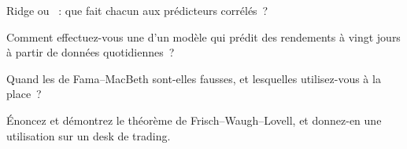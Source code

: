 \begin{interviewq}\label{iq:qm:linear-models-under-stress:3}
Ridge ou ~: que fait chacun aux prédicteurs corrélés~?
\end{interviewq}

\begin{interviewq}\label{iq:qm:linear-models-under-stress:4}
Comment effectuez-vous une  d'un modèle qui prédit des rendements à vingt jours à partir de données quotidiennes~?
\end{interviewq}

\begin{interviewq}\label{iq:qm:linear-models-under-stress:5}
Quand les  de Fama--MacBeth sont-elles fausses, et lesquelles utilisez-vous à la place~?
\end{interviewq}

\begin{interviewq}\label{iq:qm:linear-models-under-stress:6}
Énoncez et démontrez le théorème de Frisch--Waugh--Lovell, et donnez-en une utilisation sur un desk de trading.
\end{interviewq}
